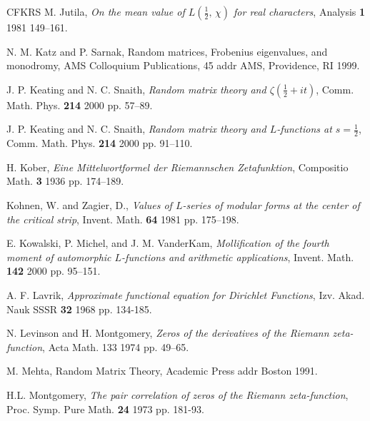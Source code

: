 \documentclass[12pt,letterpaper]{amsart}
\theoremstyle{plain}
\theoremstyle{definition}
\theoremstyle{remark}
\numberwithin{equation}{subsection}
\numberwithin{theorem}{subsection}
\numberwithin{table}{subsection}
\begin{document}
\begin{thebibliography}{CFKRS}
\newblock
 M. Jutila,  {\it On the mean value of $L({\frac12},\,\chi )$ for real characters},   Analysis
 {\bf 1}   1981
149--161.

\newblock
 N. M.  Katz and P. Sarnak,  Random matrices, Frobenius eigenvalues, and monodromy,   AMS Colloquium Publications, 45
 addr  AMS, Providence, RI
  1999.




\newblock
 J. P. Keating and N. C. Snaith,  {\it Random matrix theory and $\zeta(\frac12 +it)$},   Comm. Math. Phys.
 {\bf 214}   2000
 pp. 57--89.




\newblock
 J. P. Keating and N. C. Snaith,  {\it Random matrix theory and $L$-functions at $s=\frac12 $},   Comm. Math. Phys.
 {\bf 214}   2000
 pp.  91--110.




\newblock
 H. Kober,  {\it Eine Mittelwortformel der Riemannschen Zetafunktion},   Compositio Math.
 {\bf 3}   1936
 pp. 174--189.



\newblock
 Kohnen, W. and  Zagier, D.,  {\it Values of $L$-series of modular forms at the center of the critical
strip},    Invent.
Math.
 {\bf 64}   1981
 pp.  175--198.





\newblock   E. Kowalski, P. Michel, and J. M. VanderKam,  {\it Mollification of the fourth moment of automorphic
$L$-functions and arithmetic applications},    Invent. Math.
 {\bf 142}   2000  pp. 95--151.

\newblock
A. F. Lavrik, {\it Approximate functional equation for Dirichlet Functions},
  Izv. Akad. Nauk SSSR
{\bf 32}   1968
pp. 134-185.


\newblock   N. Levinson and H. Montgomery,  {\it Zeros of the
derivatives of the Riemann zeta-function},    Acta Math. 
133   1974  pp. 49--65.



\newblock
 M. Mehta,  Random Matrix Theory,   Academic Press
 addr  Boston
  1991.




\newblock
 H.L. Montgomery,  {\it The pair correlation of zeros of the Riemann zeta-function},   Proc. Symp. Pure Math.
 {\bf 24}   1973
 pp. 181-93.





\end{thebibliography}
\end{document}
